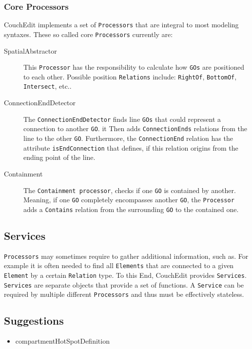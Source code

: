 \subsubsection{Core Processors}
\label{sec:core-processors}
CouchEdit implements a set of \texttt{Processors} that are integral to most modeling syntaxes. These so called core \texttt{Processors} currently are: 
\begin{description}
  \item[SpatialAbstractor] This \texttt{Processor} has the responsibility to calculate how \texttt{GOs} are positioned to each other. Possible position \texttt{Relations} include: \texttt{RightOf}, \texttt{BottomOf}, \texttt{Intersect}, etc..
  \item[ConnectionEndDetector] The \texttt{ConnectionEndDetector} finds line \texttt{GOs} that could represent a connection to another \texttt{GO}. it Then adds \texttt{ConnectionEnds} relations from the line to the other \texttt{GO}. Furthermore, the \texttt{ConnectionEnd} relation has the attribute \texttt{isEndConnection} that defines, if this relation origins from the ending point of the line.
  \item[Containment] The \texttt{Containment processor}, checks if one \texttt{GO} is contained by another. Meaning, if one \texttt{GO} completely encompasses another \texttt{GO}, the \texttt{Processor} adds a \texttt{Contains} relation from the surrounding \texttt{GO} to the contained one.
\end{description}

\subsection{Services}
\label{sec:services}
\texttt{Processors} may sometimes require to gather additional information, such as. For example it is often needed to find all \texttt{Elements} that are connected to a given \texttt{Element} by a certain \texttt{Relation} type.
To this End, CouchEdit provides \texttt{Services}. \texttt{Services} are separate objects that provide a set of functions. A \texttt{Service} can be required by multiple different \texttt{Processors} and thus must be effectively stateless.



\subsection{Suggestions}

\begin{itemize}
  \item compartmentHotSpotDefinition
\end{itemize}

